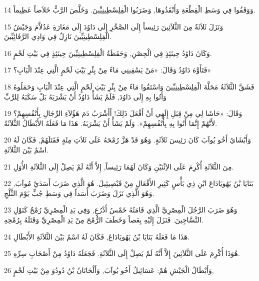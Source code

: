 \par 14 وَوَقَفُوا فِي وَسَطِ الْقِطْعَةِ وَأَنْقَذُوهَا, وَضَرَبُوا الْفِلِسْطِينِيِّينَ. وَخَلَّصَ الرَّبُّ خَلاَصاً عَظِيماً.
\par 15 وَنَزَلَ ثَلاَثَةٌ مِنَ الثَّلاَثِينَ رَئِيساً إِلَى الصَّخْرِ إِلَى دَاوُدَ إِلَى مَغَارَةِ عَدُلاَّمَ وَجَيْشُ الْفِلِسْطِينِيِّينَ نَازِلٌ فِي وَادِي الرَّفَائِيِّينَ.
\par 16 وَكَانَ دَاوُدُ حِينَئِذٍ فِي الْحِصْنِ, وَحَفَظَةُ الْفِلِسْطِينِيِّينَ حِينَئِذٍ فِي بَيْتِ لَحْمٍ.
\par 17 فَتَأَوَّهَ دَاوُدُ وَقَالَ: «مَنْ يَسْقِينِي مَاءً مِنْ بِئْرِ بَيْتِ لَحْمٍ الَّتِي عِنْدَ الْبَابِ؟»
\par 18 فَشَقَّ الثَّلاَثَةُ مَحَلَّةَ الْفِلِسْطِينِيِّينَ وَاسْتَقُوا مَاءً مِنْ بِئْرِ بَيْتِ لَحْمٍ الَّتِي عِنْدَ الْبَابِ وَحَمَلُوهُ وَأَتُوا بِهِ إِلَى دَاوُدَ, فَلَمْ يَشَأْ دَاوُدُ أَنْ يَشْرَبَهُ بَلْ سَكَبَهُ لِلرَّبِّ
\par 19 وَقَالَ: «حَاشَا لِي مِنْ قِبَلِ إِلَهِي أَنْ أَفْعَلَ ذَلِكَ! أَأَشْرَبُ دَمَ هَؤُلاَءِ الرِّجَالِ بِأَنْفُسِهِمْ؟ لأَنَّهُمْ إِنَّمَا أَتُوا بِهِ بِأَنْفُسِهِمْ». وَلَمْ يَشَأْ أَنْ يَشْرَبَهُ. هَذَا مَا فَعَلَهُ الأَبْطَالُ الثَّلاَثَةُ.
\par 20 وَأَبْشَايُ أَخُو يُوآبَ كَانَ رَئِيسَ ثَلاَثَةٍ. وَهُوَ قَدْ هَزَّ رُمْحَهُ عَلَى ثَلاَثِ مِئَةٍ فَقَتَلَهُمْ, فَكَانَ لَهُ اسْمٌ بَيْنَ الثَّلاَثَةِ.
\par 21 مِنَ الثَّلاَثَةِ أُكْرِمَ عَلَى الاِثْنَيْنِ وَكَانَ لَهُمَا رَئِيساً, إِلاَّ أَنَّهُ لَمْ يَصِلْ إِلَى الثَّلاَثَةِ الأُوَلِ.
\par 22 بَنَايَا بْنُ يَهُويَادَاعَ ابْنِ ذِي بَأْسٍ كَثِيرِ الأَفْعَالِ مِنْ قَبْصِيئِيلَ. هُوَ الَّذِي ضَرَبَ أَسَدَيْ مُوآبَ, وَهُوَ الَّذِي نَزَلَ وَضَرَبَ أَسَداً فِي وَسَطِ جُبٍّ يَوْمَ الثَّلْجِ.
\par 23 وَهُوَ ضَرَبَ الرَّجُلَ الْمِصْرِيَّ الَّذِي قَامَتُهُ خَمْسُ أَذْرُعٍ, وَفِي يَدِ الْمِصْرِيِّ رُمْحٌ كَنَوْلِ النَّسَّاجِينَ. فَنَزَلَ إِلَيْهِ بِعَصاً وَخَطَفَ الرُّمْحَ مِنْ يَدِ الْمِصْرِيِّ وَقَتَلَهُ بِرُمْحِهِ.
\par 24 هَذَا مَا فَعَلَهُ بَنَايَا بْنُ يَهُويَادَاعَ, فَكَانَ لَهُ اسْمٌ بَيْنَ الثَّلاَثَةِ الأَبْطَالِ.
\par 25 هُوَذَا أُكْرِمَ عَلَى الثَّلاَثِينَ إِلاَّ أَنَّهُ لَمْ يَصِلْ إِلَى الثَّلاَثَةِ. فَجَعَلَهُ دَاوُدُ مِنْ أَصْحَابِ سِرِّهِ.
\par 26 وَأَبْطَالُ الْجَيْشِ هُمْ: عَسَائِيلُ أَخُو يُوآبَ, وَأَلْحَانَانُ بْنُ دُودُوَ مِنْ بَيْتِ لَحْمٍ,
